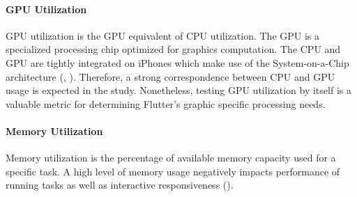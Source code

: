 \paragraph*{GPU Utilization}\label{paragraph::gpu_utilitzation}\hfill \break
GPU utilization is the GPU equivalent of CPU utilization.
The GPU is a specialized processing chip optimized for graphics computation.
The CPU and GPU are tightly integrated on iPhones which make use of the System-on-a-Chip architecture (\cite{Martin2001}, \cite{WikiChip2020}).
Therefore, a strong correspondence between CPU and GPU usage is expected in the study. 
Nonetheless, testing GPU utilization by itself is a valuable metric for determining Flutter's graphic specific processing needs.

\paragraph*{Memory Utilization}\label{paragraph::memory_utilization}\hfill \break
Memory utilization is the percentage of available memory capacity used for a specific task. 
A high level of memory usage negatively impacts performance of running tasks as well as interactive responsiveness (\cite{Ljubuncic2015}).


